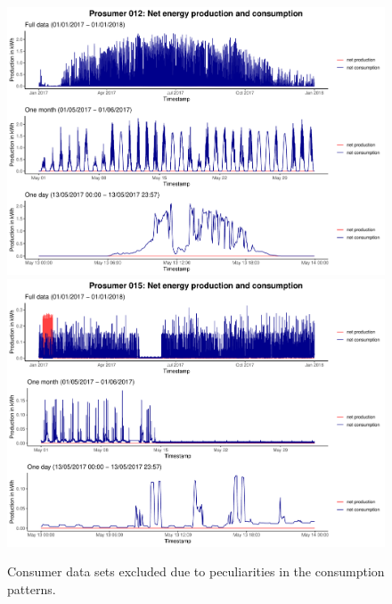 \begin{centering}
\begin{figure}[!htbp]
        \includegraphics[width=\textwidth-0.85cm]{thesis/graphs/timeseries/p012_prod&cons.pdf}\vspace{0.3cm}
        \includegraphics[width=\textwidth-0.85cm]{thesis/graphs/timeseries/p015_prod&cons.pdf}
        \caption[Consumer data sets excluded due to peculiarities in the consumption patterns]{Consumer data sets excluded due to peculiarities in the consumption patterns. \quantnet}
        \label{App:Fig:excludedpros}
\end{figure}
\end{centering}




